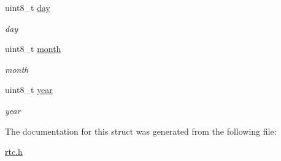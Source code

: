 \begin{DoxyCompactItemize}
\mbox{\label{struct__clock__calender__regs__t___aa4809c2ce3216e4d7c0bafc32d9cdeef}} 
uint8\+\_\+t \hyperlink{struct__clock__calender__regs__t___aa4809c2ce3216e4d7c0bafc32d9cdeef}{day}
\begin{DoxyCompactList}\small\item\em day \end{DoxyCompactList}\item 
\mbox{\label{struct__clock__calender__regs__t___ab80300c7aa3b20f9cd3f74130df75570}} 
uint8\+\_\+t \hyperlink{struct__clock__calender__regs__t___ab80300c7aa3b20f9cd3f74130df75570}{month}
\begin{DoxyCompactList}\small\item\em month \end{DoxyCompactList}\item 
\mbox{\label{struct__clock__calender__regs__t___a95dc3479eb61b9b577f6be55b6691a5e}} 
uint8\+\_\+t \hyperlink{struct__clock__calender__regs__t___a95dc3479eb61b9b577f6be55b6691a5e}{year}
\begin{DoxyCompactList}\small\item\em year \end{DoxyCompactList}\end{DoxyCompactItemize}


The documentation for this struct was generated from the following file\+:\begin{DoxyCompactItemize}
\item 
\hyperlink{rtc_8h}{rtc.\+h}\end{DoxyCompactItemize}
